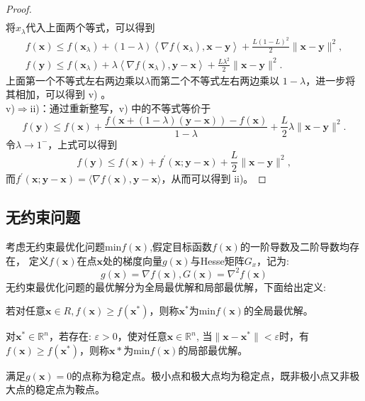 \begin{proof}
\begin{equation}
\begin{array}{l}
\end{array}
    \nonumber
\end{equation}
将$x_{\lambda}  $代入上面两个等式，可以得到
\begin{equation}
\begin{array}{c}
f(\bm{x}) \leq f\left(\bm{x}_{\lambda}\right)+(1-\lambda)\left\langle\nabla f\left(\bm{x}_{\lambda}\right), \bm{x}-\bm{y}\right\rangle+\frac{L(1-L)^{2}}{2}\|\bm{x}-\bm{y}\|^{2} , \\
f(\bm{y}) \leq f\left(\bm{x}_{\lambda}\right)+\lambda\left\langle\nabla f\left(\bm{x}_{\lambda}\right), \bm{y}-\bm{x}\right\rangle+\frac{L \lambda^{2}}{2}\|\bm{x}-\bm{y}\|^{2} .
\end{array}
    \nonumber
\end{equation}
上面第一个不等式左右两边乘以$  \lambda  $而第二个不等式左右两边乘以  $1-\lambda $，进一步将其相加，可以得到 v)  。\\
v)$ \Rightarrow $ii)：通过重新整写，v) 中的不等式等价于
\begin{equation}
f(\bm{y}) \leq f(\bm{x})+\frac{f(\bm{x}+(1-\lambda)(\bm{y}-\bm{x}))-f(\bm{x})}{1-\lambda}+\frac{L}{2} \lambda\|\bm{x}-\bm{y}\|^{2} .
    \nonumber
\end{equation}
令$  \lambda \rightarrow 1^{-} $，上式可以得到
\begin{equation}
f(\bm{y}) \leq f(\bm{x})+f^{\prime}(\bm{x} ; \bm{y}-\bm{x})+\frac{L}{2}\|\bm{x}-\bm{y}\|^{2},
    \nonumber
\end{equation}
而$  f^{\prime}(\bm{x} ; \bm{y}-\bm{x})=\langle\nabla f(\bm{x}), \bm{y}-\bm{x}\rangle $，从而可以得到 ii)。
\end{proof}

\subsection{无约束问题}
考虑无约束最优化问题min$f(\bm{x})$,假定目标函数$f(\bm{x})$的一阶导数及二阶导数均存在，
定义$f(\bm{x})$在点$\bm{x}$处的梯度向量$g(\bm{x})$与Hesse矩阵$G_x$，记为:
\begin{equation}
    g(\bm{x})=\nabla f(\bm{x}), G(\bm{x})= \nabla^2f(\bm{x})    
\end{equation}
无约束最优化问题的最优解分为全局最优解和局部最优解，下面给出定义:
\begin{definition}[全局最优解]
    若对任意$\bm{x}\in R,f(\bm{x}) \geq f(\bm{x}^{*})$，则称$\bm{x}^{*}$为min$f(\bm{x})$的全局最优解。
\end{definition}
\begin{definition}[局部最优解]
    对$\bm{x}^*\in\mathbb{R}^{n}$，若存在: $\varepsilon >0$，使对任意$\bm{x} \in\mathbb{R}^{n}$, 
    当$\|\bm{x}-\bm{x}^*\| < \varepsilon$时，有$f(\bm{x}) ≥ f(\bm{x}^*)$，则称$\bm{x}*$为min$f(\bm{x})$的局部最优解。
\end{definition}
\begin{definition}[稳定点]
    满足$g(\bm{x})= 0$的点称为稳定点。极小点和极大点均为稳定点，既非极小点又非极大点的稳定点为鞍点。
\end{definition}

